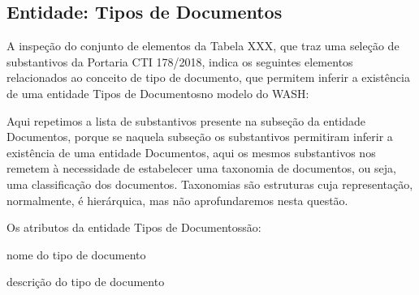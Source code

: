 \documentclass[
12pt,		%
openright,	%
twoside,  %
a4paper,			%
chapter=TITLE,		%
english,			%
french,				%
spanish,			%
brazil				%
]{USPSC-classe/USPSC}
\begin{document}
\subsection[Entidade: Tipos de Documentos]{Entidade: Tipos de Documentos}\label{Entidade: Tipos de Documentos}
A inspe\c{c}\~ao do conjunto de elementos da Tabela XXX, que traz uma sele\c{c}\~ao de substantivos da Portaria CTI 178/2018, indica os seguintes elementos relacionados ao conceito de \textquotedbl tipo de documento\textquotedbl , que permitem inferir a exist\^encia de uma entidade \textquotedbl Tipos de Documentos\textquotedbl  no modelo do WASH:



\noindent\begin{center}\mbox{\centering{}}\end{center}


Aqui repetimos a lista de substantivos presente na subse\c{c}\~ao da entidade \textquotedbl Documentos\textquotedbl , porque se naquela subse\c{c}\~ao os substantivos permitiram inferir a exist\^encia de uma entidade \textquotedbl Documentos\textquotedbl , aqui os mesmos substantivos nos remetem \`a necessidade de estabelecer uma taxonomia de documentos, ou seja, uma classifica\c{c}\~ao dos documentos. Taxonomias s\~ao estruturas cuja representa\c{c}\~ao, normalmente, \'e hier\'arquica, mas n\~ao aprofundaremos nesta quest\~ao.


Os atributos da entidade \textquotedbl Tipos de Documentos\textquotedbl  s\~ao:



\begin{alineas}
\item nome do tipo de documento
\item descri\c{c}\~ao do tipo de documento
\end{alineas}
\end{document}
